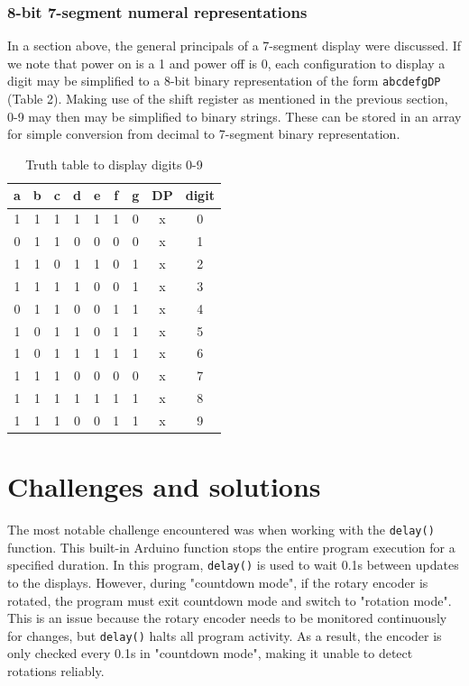 \documentclass[fleqn]{article}
\begin{document}
\subsubsection*{8-bit 7-segment numeral representations}
In a section above, the general principals of a 7-segment display were discussed. If we note that power on is a 1 and power off is 0, each configuration to display a digit may be simplified to a 8-bit binary representation of the form \verb|abcdefgDP| (Table 2). Making use of the shift register as mentioned in the previous section, 0-9 may then may be simplified to binary strings. These can be stored in an array for simple conversion from decimal to 7-segment binary representation.
\begin{table}[H]
    \centering
    \setlength{\tabcolsep}{15pt}
    \begin{tabular}{cccccccc|c}
    \textbf{a} & \textbf{b} & \textbf{c} & \textbf{d} & \textbf{e} & \textbf{f} & \textbf{g} & \textbf{DP} & \textbf{digit} \\ \hline
    1 & 1 & 1 & 1 & 1 & 1 & 0 & x & 0 \\ \hline
    0 & 1 & 1 & 0 & 0 & 0 & 0 & x & 1 \\ \hline
    1 & 1 & 0 & 1 & 1 & 0 & 1 & x & 2 \\ \hline
    1 & 1 & 1 & 1 & 0 & 0 & 1 & x & 3 \\ \hline
    0 & 1 & 1 & 0 & 0 & 1 & 1 & x & 4 \\ \hline
    1 & 0 & 1 & 1 & 0 & 1 & 1 & x & 5 \\ \hline
    1 & 0 & 1 & 1 & 1 & 1 & 1 & x & 6 \\ \hline
    1 & 1 & 1 & 0 & 0 & 0 & 0 & x & 7 \\ \hline
    1 & 1 & 1 & 1 & 1 & 1 & 1 & x & 8 \\ \hline
    1 & 1 & 1 & 0 & 0 & 1 & 1 & x & 9 \\
    \end{tabular}
    \caption{Truth table to display digits 0-9}
\end{table}


\section*{Challenges and solutions}
The most notable challenge encountered was when working with the \verb|delay()| function. This built-in Arduino function stops the entire program execution for a specified duration. In this program, \verb|delay()| is used to wait 0.1s between updates to the displays. However, during "countdown mode", if the rotary encoder is rotated, the program must exit countdown mode and switch to "rotation mode". This is an issue because the rotary encoder needs to be monitored continuously for changes, but \verb|delay()| halts all program activity. As a result, the encoder is only checked every 0.1s in "countdown mode", making it unable to detect rotations reliably. 
\end{document}
